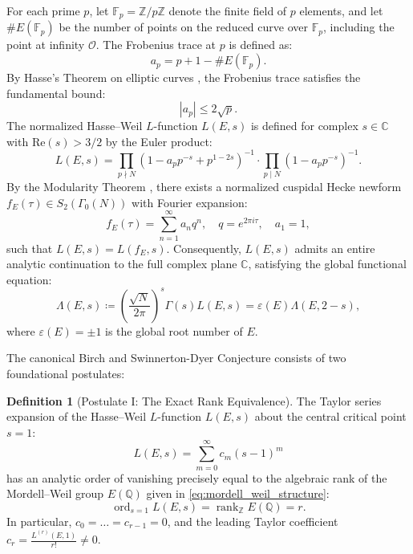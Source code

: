 \documentclass[11pt,reqno]{article}
\theoremstyle{plain}
\theoremstyle{definition}
\newtheorem{definition}[theorem]{Definition}
\DeclareMathOperator{\rank}{rank}
\DeclareMathOperator{\ord}{ord}
\begin{document}
For each prime $p$, let $\mathbb{F}_p = \mathbb{Z}/p\mathbb{Z}$ denote the finite field of $p$ elements, and let $\#E(\mathbb{F}_p)$ be the number of points on the reduced curve over $\mathbb{F}_p$, including the point at infinity $\mathcal{O}$. The Frobenius trace at $p$ is defined as:
\begin{equation}
    a_p = p + 1 - \#E(\mathbb{F}_p).
\end{equation}
By Hasse's Theorem on elliptic curves \cite{hasse_1936}, the Frobenius trace satisfies the fundamental bound:
\begin{equation}
    |a_p| \le 2\sqrt{p}.
\end{equation}
The normalized Hasse--Weil $L$-function $L(E, s)$ is defined for complex $s \in \mathbb{C}$ with $\mathrm{Re}(s) > 3/2$ by the Euler product:
\begin{equation}
    \label{eq:l_function_euler}
    L(E, s) = \prod_{p \nmid N} \left( 1 - a_p p^{-s} + p^{1 - 2s} \right)^{-1} \cdot \prod_{p \mid N} \left( 1 - a_p p^{-s} \right)^{-1}.
\end{equation}
By the Modularity Theorem \cite{wiles_1995, taylor_wiles_1995, breuil_conrad_diamond_taylor_2001}, there exists a normalized cuspidal Hecke newform $f_E(\tau) \in S_2(\Gamma_0(N))$ with Fourier expansion:
\begin{equation}
    f_E(\tau) = \sum_{n=1}^\infty a_n q^n, \quad q = e^{2\pi i \tau}, \quad a_1 = 1,
\end{equation}
such that $L(E, s) = L(f_E, s)$. Consequently, $L(E, s)$ admits an entire analytic continuation to the full complex plane $\mathbb{C}$, satisfying the global functional equation:
\begin{equation}
    \label{eq:functional_equation}
    \Lambda(E, s) \coloneqq \left( \frac{\sqrt{N}}{2\pi} \right)^s \Gamma(s) L(E, s) = \varepsilon(E) \Lambda(E, 2 - s),
\end{equation}
where $\varepsilon(E) = \pm 1$ is the global root number of $E$.

The canonical Birch and Swinnerton-Dyer Conjecture consists of two foundational postulates:

\begin{definition}[Postulate I: The Exact Rank Equivalence]
\label{def:postulate_I}
The Taylor series expansion of the Hasse--Weil $L$-function $L(E, s)$ about the central critical point $s = 1$:
\begin{equation}
    L(E, s) = \sum_{m=0}^\infty c_m (s - 1)^m
\end{equation}
has an analytic order of vanishing precisely equal to the algebraic rank of the Mordell--Weil group $E(\mathbb{Q})$ given in \eqref{eq:mordell_weil_structure}:
\begin{equation}
    \label{eq:bsd_postulate_I}
    \boxed{\ord_{s=1} L(E, s) = \rank_{\mathbb{Z}} E(\mathbb{Q}) = r.}
\end{equation}
In particular, $c_0 = \dots = c_{r-1} = 0$, and the leading Taylor coefficient $c_r = \frac{L^{(r)}(E, 1)}{r!} \neq 0$.
\end{definition}
\end{document}
